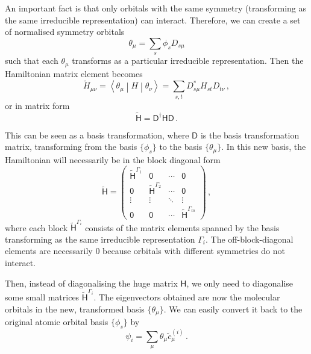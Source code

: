 \documentclass{article}
\theoremstyle{plain}\theoremheaderfont{\normalfont\itshape}\theorembodyfont{\rmfamily}\theoremseparator{.}\newtheorem*{rem}{Remark}\newtheorem*{ex}{Example}\newtheorem*{proof}{Proof}\newtheorem*{altp}{Alternative proof}
\theoremstyle{plain}\theoremheaderfont{\normalfont\bfseries}\theorembodyfont{\rmfamily}\theoremseparator{.}\newtheorem{thm}{Theorem}[section]\newtheorem{lem}[thm]{Lemma}\newtheorem{prop}[thm]{Proposition}\newtheorem*{cor}{Corollary}\newtheorem{defn}[thm]{Definition}\newtheorem{clm}[thm]{Claim}\newtheorem{clminproof}{Claim}\newtheorem{pos}{Postulate}[section]
\theoremstyle{break}\theoremheaderfont{\normalfont\itshape}\theorembodyfont{\rmfamily}\theoremseparator{.\medskip}\newtheorem*{proofskip}{Proof}\newtheorem*{exs}{Examples}\newtheorem*{rems}{Remarks}
\theoremstyle{break}\theoremheaderfont{\normalfont\bfseries}\theorembodyfont{\rmfamily}\theoremseparator{.\medskip}\newtheorem{lemskip}[thm]{Lemma}\newtheorem{defnskip}[thm]{Definition}\newtheorem{propskip}[thm]{Proposition}\newtheorem{thmskip}[thm]{Theorem}
\numberwithin{equation}{section}
\newcommand{\mel}[3]{\left\langle #1 \middle| #2 \middle| #3 \right\rangle}
\begin{document}
    An important fact is that only orbitals with the same symmetry (transforming as the same irreducible representation) can interact. Therefore, we can create a set of normalised symmetry orbitals
    \begin{equation}
        \theta_\mu=\sum_s \phi_s D_{s\mu}
    \end{equation}
    such that each \(\theta_\mu\) transforms as a particular irreducible representation. Then the Hamiltonian matrix element becomes
    \begin{equation}
        \tilde{H}_{\mu\nu}=\mel{\theta_\mu}{H}{\theta_\nu}=\sum_{s,t}D_{s\mu}^* H_{st}D_{t\nu}\,,
    \end{equation}
    or in matrix form
    \begin{equation}
        \tilde{\mathsf{H}}=\mathsf{D^\dagger H D}\,.
    \end{equation}

    This can be seen as a basis transformation, where \(\mathsf{D}\) is the basis transformation matrix, transforming from the basis \(\{\phi_s\}\) to the basis \(\{\theta_\mu\}\). In this new basis, the Hamiltonian will necessarily be in the block diagonal form
    \begin{equation}
        \tilde{\mathsf{H}}=\begin{pmatrix}
            \tilde{\mathsf{H}}^{\Gamma_1} & \mathsf{0} & \cdots & \mathsf{0} \\
            \mathsf{0} & \tilde{\mathsf{H}}^{\Gamma_2} & \cdots & \mathsf{0} \\
            \vdots & \vdots & \ddots & \vdots \\
            \mathsf{0} & \mathsf{0} & \cdots & \tilde{\mathsf{H}}^{\Gamma_m}
        \end{pmatrix}\,,
    \end{equation}
    where each block \(\tilde{\mathsf{H}}^{\Gamma_i}\) consists of the matrix elements spanned by the basis transforming as the same irreducible representation \(\Gamma_i\). The off-block-diagonal elements are necessarily \(0\) because orbitals with different symmetries do not interact.

    Then, instead of diagonalising the huge matrix \(\mathsf{H}\), we only need to diagonalise some small matrices \(\tilde{\mathsf{H}}^{\Gamma_i}\). The eigenvectors obtained are now the molecular orbitals in the new, transformed basis \(\{\theta_\mu\}\). We can easily convert it back to the original atomic orbital basis \(\{\phi_s\}\) by
    \begin{equation}
        \psi_i=\sum_\mu\theta_\mu\tilde{c}_{\mu}^{(i)}\,.
    \end{equation}
\end{document}
